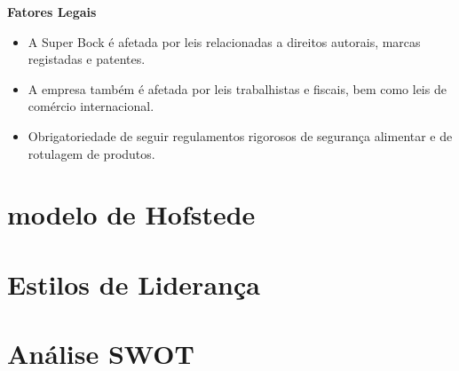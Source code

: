 \noindent \textbf{Fatores Legais} %
\begin{itemize}
    \item A Super Bock é afetada por leis relacionadas a direitos autorais, marcas registadas e patentes.
    \item A empresa também é afetada por leis trabalhistas e fiscais, bem como leis de comércio internacional.
    \item Obrigatoriedade de seguir regulamentos rigorosos de segurança alimentar e de rotulagem de produtos.
\end{itemize}

\section{modelo de Hofstede}
\section{Estilos de Liderança}
\section{Análise SWOT}